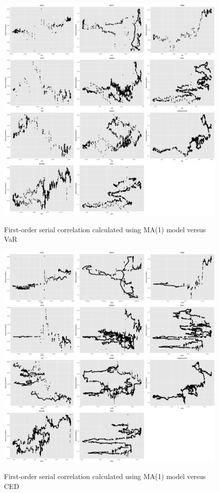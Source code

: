 \documentclass[12pt]{article}
\begin{document}
\begin{figure}
  \caption{First-order serial correlation calculated using MA(1) model versus VaR}
  \includegraphics[width = 1\textwidth]{../results/SerCol-ES5yrMA1}
  \label{fig:SerCol-ES5yrMA1}
\end{figure}

\begin{figure}
  \caption{First-order serial correlation calculated using MA(1) model versus CED}
  \includegraphics[width = 1\textwidth]{../results/SerCol-CED5yr3monMA1}
  \label{fig:SerCol-CED5yr3monMA1}
\end{figure}
\end{document}
